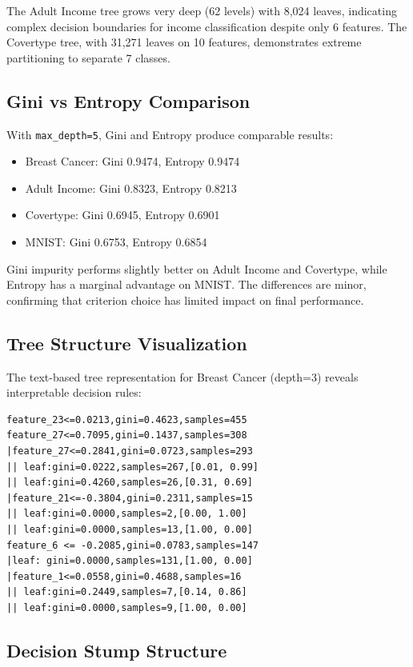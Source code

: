 \documentclass[conference,12pt]{IEEEtran}
\begin{document}
The Adult Income tree grows very deep (62 levels) with 8,024 leaves, indicating complex decision boundaries for income classification despite only 6 features. The Covertype tree, with 31,271 leaves on 10 features, demonstrates extreme partitioning to separate 7 classes.

\subsection{Gini vs Entropy Comparison}

With \texttt{max\_depth=5}, Gini and Entropy produce comparable results:
\begin{itemize}
    \item Breast Cancer: Gini 0.9474, Entropy 0.9474
    \item Adult Income: Gini 0.8323, Entropy 0.8213
    \item Covertype: Gini 0.6945, Entropy 0.6901
    \item MNIST: Gini 0.6753, Entropy 0.6854
\end{itemize}

Gini impurity performs slightly better on Adult Income and Covertype, while Entropy has a marginal advantage on MNIST. The differences are minor, confirming that criterion choice has limited impact on final performance.

\subsection{Tree Structure Visualization}

The text-based tree representation for Breast Cancer (depth=3) reveals interpretable decision rules:

{\small
\begin{verbatim}
feature_23<=0.0213,gini=0.4623,samples=455
feature_27<=0.7095,gini=0.1437,samples=308
|feature_27<=0.2841,gini=0.0723,samples=293
|| leaf:gini=0.0222,samples=267,[0.01, 0.99]
|| leaf:gini=0.4260,samples=26,[0.31, 0.69]
|feature_21<=-0.3804,gini=0.2311,samples=15
|| leaf:gini=0.0000,samples=2,[0.00, 1.00]
|| leaf:gini=0.0000,samples=13,[1.00, 0.00]
feature_6 <= -0.2085,gini=0.0783,samples=147
|leaf: gini=0.0000,samples=131,[1.00, 0.00]
|feature_1<=0.0558,gini=0.4688,samples=16
|| leaf:gini=0.2449,samples=7,[0.14, 0.86]
|| leaf:gini=0.0000,samples=9,[1.00, 0.00]
\end{verbatim}
}
\subsection{Decision Stump Structure}
\end{document}
